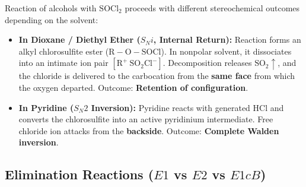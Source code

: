 \documentclass[10pt,a4paper]{article}
\begin{document}
\begin{conceptbox}
Reaction of alcohols with $\mathrm{SOCl_2}$ proceeds with different stereochemical outcomes depending on the solvent:
\begin{itemize}
  \item \textbf{In Dioxane / Diethyl Ether ($S_Ni$, Internal Return):} Reaction forms an alkyl chlorosulfite ester ($\mathrm{R-O-SOCl}$). In nonpolar solvent, it dissociates into an intimate ion pair $[\mathrm{R}^+\ \mathrm{SO_2Cl}^-]$. Decomposition releases $\mathrm{SO_2}\uparrow$, and the chloride is delivered to the carbocation from the \textbf{same face} from which the oxygen departed. Outcome: \textbf{Retention of configuration}.
  \item \textbf{In Pyridine ($S_N2$ Inversion):} Pyridine reacts with generated $\mathrm{HCl}$ and converts the chlorosulfite into an active pyridinium intermediate. Free chloride ion attacks from the \textbf{backside}. Outcome: \textbf{Complete Walden inversion}.
\end{itemize}
\end{conceptbox}

\subsection{Elimination Reactions (\texorpdfstring{$E1$}{E1} vs \texorpdfstring{$E2$}{E2} vs \texorpdfstring{$E1cB$}{E1cB})}
\end{document}
